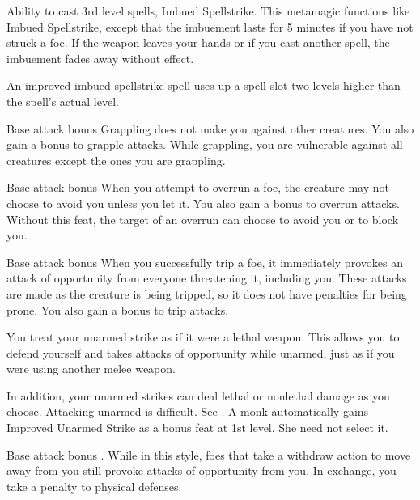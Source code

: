  Ability to cast 3rd level spells, Imbued Spellstrike.
 This metamagic functions like Imbued Spellstrike, except that the imbuement lasts for 5 minutes if you have not struck a foe. If the weapon leaves your hands or if you cast another spell, the imbuement fades away without effect.

An improved imbued spellstrike spell uses up a spell slot two levels higher than the spell's actual level.

 Base attack bonus 
 Grappling does not make you \vulnerable against other creatures. You also gain a  bonus to grapple attacks.
 While grappling, you are vulnerable against all creatures except the ones you are grappling.

 Base attack bonus 
 When you attempt to overrun a foe, the creature may not choose to avoid you unless you let it. You also gain a  bonus to overrun attacks.
 Without this feat, the target of an overrun can choose to avoid you or to block you.

 Base attack bonus 
 When you successfully trip a foe, it immediately provokes an attack of opportunity from everyone threatening it, including you. These attacks are made as the creature is being tripped, so it does not have penalties for being prone. You also gain a  bonus to trip attacks.

 You treat your unarmed strike as if it were a lethal weapon. This allows you to defend yourself and takes attacks of opportunity while unarmed, just as if you were using another melee weapon.

In addition, your unarmed strikes can deal lethal or nonlethal damage as you choose.
 Attacking unarmed is difficult. See .
 A monk automatically gains Improved Unarmed Strike as a bonus feat at 1st level. She need not select it.

\featpre Base attack bonus .
\featben While in this style, foes that take a withdraw action to move away from you still provoke attacks of opportunity from you. In exchange, you take a  penalty to physical defenses.

